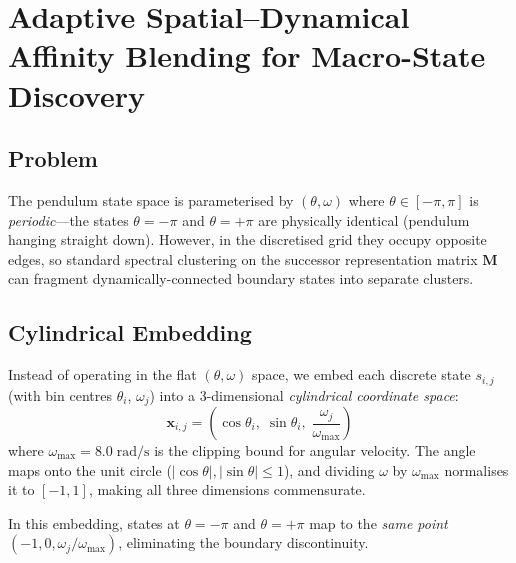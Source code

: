 %
%

\section{Adaptive Spatial--Dynamical Affinity Blending for Macro-State Discovery}

\subsection{Problem}

The pendulum state space is parameterised by $(\theta, \omega)$ where
$\theta \in [-\pi, \pi]$ is \emph{periodic}---the states $\theta = -\pi$
and $\theta = +\pi$ are physically identical (pendulum hanging straight
down).  However, in the discretised grid they occupy opposite edges, so
standard spectral clustering on the successor representation matrix
$\mathbf{M}$ can fragment dynamically-connected boundary states into
separate clusters.

\subsection{Cylindrical Embedding}

Instead of operating in the flat $(\theta, \omega)$ space, we embed each
discrete state $s_{i,j}$ (with bin centres $\theta_i$, $\omega_j$) into
a 3-dimensional \emph{cylindrical coordinate space}:
\begin{equation}
\mathbf{x}_{i,j} = \left(\cos\theta_i,\;\sin\theta_i,\;\frac{\omega_j}{\omega_{\max}}\right)
\end{equation}
where $\omega_{\max} = 8.0\;\text{rad/s}$ is the clipping bound for
angular velocity.  The angle maps onto the unit circle
($|\cos\theta|, |\sin\theta| \leq 1$), and dividing $\omega$ by
$\omega_{\max}$ normalises it to $[-1, 1]$, making all three dimensions
commensurate.

In this embedding, states at $\theta = -\pi$ and $\theta = +\pi$ map to
the \emph{same point} $(-1, 0, \omega_j/\omega_{\max})$, eliminating the
boundary discontinuity.

